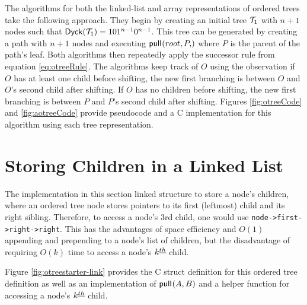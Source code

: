 





The algorithms for both the linked-list and array representations of ordered trees take the following approach.  They begin by creating an initial tree $\mathcal{T}_1$ with $n+1$ nodes such that $\mathsf{Dyck}{(\mathcal{T}_1)}=101^{n-1}0^{n-1}$.  This tree can be generated by creating a path with $n+1$ nodes and executing $\pull{root,P}$ where $P$ is the parent of the path's leaf. Both algorithms then repeatedly apply the successor rule from equation \ref{eq:otreeRule}.  The algorithms keep track of $O$ using the observation if $O$ has at least one child before shifting, the new first branching is between $O$ and $O$'s second child after shifting.  If $O$ has no children before shifting, the new first branching is between $P$ and $P$'s second child after shifting. Figures \ref{fig:otreeCode} and \ref{fig:aotreeCode} provide pseudocode and a C implementation for this algorithm using each tree representation. 


\section{Storing Children in a Linked List}\label{sec:otree-link}
The implementation in this section linked structure to store a node's children, where an ordered tree node stores pointers to its first (leftmost) child and its right sibling.  Therefore, to access a node's 3rd child, one would use \verb+node->first->right->right+.
This has the advantages of space efficiency and $O(1)$ appending and prepending to a node's list of children, but the disadvantage of requiring $O(k)$ time to access a node's $k^{\underline{th}}$ child. 

Figure \ref{fig:otreestarter-link} provides the C struct definition for this ordered tree definition as well as an implementation of $\mathsf{pull}_{}(A,B)$ and a helper function for accessing a node's $k^{\underline{th}}$ child. 

